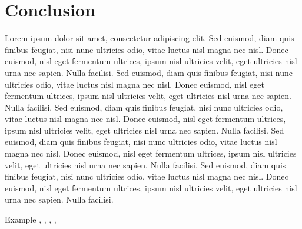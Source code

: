 \documentclass[a4paper, 12pt]{report}
\begin{document}
    \chapter{Conclusion}
    Lorem ipsum dolor sit amet, consectetur adipiscing elit. Sed euismod, diam quis finibus feugiat, nisi nunc ultricies odio, vitae luctus nisl magna nec nisl. Donec euismod, nisl eget fermentum ultrices, ipsum nisl ultricies velit, eget ultricies nisl urna nec sapien. Nulla facilisi. Sed euismod, diam quis finibus feugiat, nisi nunc ultricies odio, vitae luctus nisl magna nec nisl. Donec euismod, nisl eget fermentum ultrices, ipsum nisl ultricies velit, eget ultricies nisl urna nec sapien. Nulla facilisi. Sed euismod, diam quis finibus feugiat, nisi nunc ultricies odio, vitae luctus nisl magna nec nisl. Donec euismod, nisl eget fermentum ultrices, ipsum nisl ultricies velit, eget ultricies nisl urna nec sapien. Nulla facilisi. Sed euismod, diam quis finibus feugiat, nisi nunc ultricies odio, vitae luctus nisl magna nec nisl. Donec euismod, nisl eget fermentum ultrices, ipsum nisl ultricies velit, eget ultricies nisl urna nec sapien. Nulla facilisi. Sed euismod, diam quis finibus feugiat, nisi nunc ultricies odio, vitae luctus nisl magna nec nisl. Donec euismod, nisl eget fermentum ultrices, ipsum nisl ultricies velit, eget ultricies nisl urna nec sapien. Nulla facilisi.

    Example \cite{CI/CDGitHub}, \cite{JenkinsDocs}, \cite{DockerDocs}, \cite{GitHubDocs}, \cite{CI/CDpipeline}

    \printbibliography

    \appendix
\end{document}
